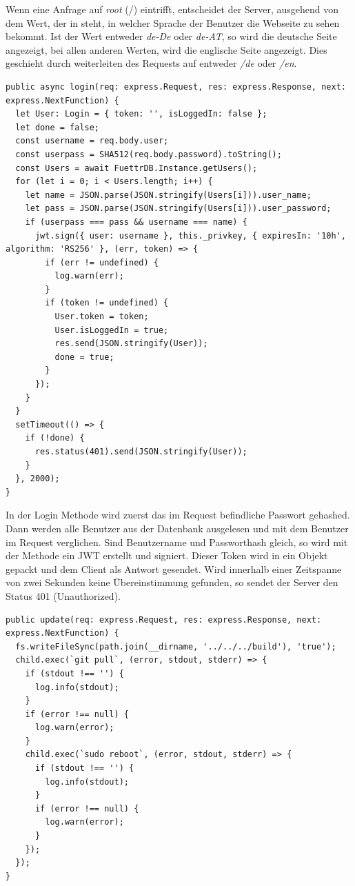Wenn eine Anfrage auf \textit{root} (/) eintrifft, entscheidet der Server, ausgehend von dem Wert, der in  steht, in welcher Sprache der Benutzer die Webseite zu sehen bekommt. Ist der Wert entweder \textit{de-De} oder \textit{de-AT}, so wird die deutsche Seite angezeigt, bei allen anderen Werten, wird die englische Seite angezeigt. Dies geschieht durch weiterleiten des Requests auf entweder \textit{/de} oder \textit{/en}. 

\begin{lstlisting}[style=TS,caption=Login Methode,label=login]
public async login(req: express.Request, res: express.Response, next: express.NextFunction) {
  let User: Login = { token: '', isLoggedIn: false };
  let done = false;
  const username = req.body.user;
  const userpass = SHA512(req.body.password).toString();
  const Users = await FuettrDB.Instance.getUsers();
  for (let i = 0; i < Users.length; i++) {
    let name = JSON.parse(JSON.stringify(Users[i])).user_name;
    let pass = JSON.parse(JSON.stringify(Users[i])).user_password;
    if (userpass === pass && username === name) {
      jwt.sign({ user: username }, this._privkey, { expiresIn: '10h', algorithm: 'RS256' }, (err, token) => {
        if (err != undefined) {
          log.warn(err);
        }
        if (token != undefined) {
          User.token = token;
          User.isLoggedIn = true;
          res.send(JSON.stringify(User));
          done = true;
        }
      });
    }
  }
  setTimeout(() => {
    if (!done) {
      res.status(401).send(JSON.stringify(User));
    }
  }, 2000);
}
\end{lstlisting}

In der Login Methode wird zuerst das im Request befindliche Passwort gehashed. Dann werden alle Benutzer aus der Datenbank ausgelesen und mit dem Benutzer im Request verglichen. Sind Benutzername und Passworthash gleich, so wird mit der Methode  ein \ac{JWT} erstellt und signiert. Dieser Token wird in ein Objekt gepackt und dem Client als Antwort gesendet. Wird innerhalb einer Zeitspanne von zwei Sekunden keine Übereinstimmung gefunden, so sendet der Server den Status 401 (Unauthorized). 

\begin{lstlisting}[caption=Update Methode,label=update methode,style=TS]
public update(req: express.Request, res: express.Response, next: express.NextFunction) {
  fs.writeFileSync(path.join(__dirname, '../../../build'), 'true');
  child.exec(`git pull`, (error, stdout, stderr) => {
    if (stdout !== '') {
      log.info(stdout);
    }
    if (error !== null) {
      log.warn(error);
    }
    child.exec(`sudo reboot`, (error, stdout, stderr) => {
      if (stdout !== '') {
        log.info(stdout);
      }
      if (error !== null) {
        log.warn(error);
      }
    });
  });
}
\end{lstlisting}


